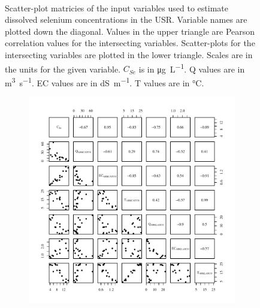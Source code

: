 \begin{linenumbers}
\begin{landscape}
\begin{figure}
\begin{subfigure}{0.7\textwidth}
		\end{subfigure}\\
		\caption[Scatter-plot matricies of the input variables used to estimate dissolved selenium concentrations in the USR.]{Scatter-plot matricies of the input variables used to estimate dissolved selenium concentrations in the USR.  Variable names are plotted down the diagonal.  Values in the upper triangle are Pearson correlation values for the intersecting variables.  Scatter-plots for the intersecting variables are plotted in the lower triangle.  Scales are in the units for the given variable.  $C_{Se}$ is in \si{\micro\gram\per\liter}.  Q values are in \si{\cubic\meter\per\second}.  EC values are in \si{\deci\siemens\per\meter}.  T values are in \si{\degreeCelsius}.}
		\label{fig:concFullPairs_US}
	\end{figure}
\end{landscape}
\subfiguremid
\begin{landscape}
	\begin{figure}
		\begin{subfigure}{0.7\textwidth}
			\centering
			\includegraphics[width=\tableCustomSize]{"Figures/Results_USR/Stochastic/Conc Model Full PairsU167"}
		\end{subfigure}%
		\begin{subfigure}{0.7\textwidth}

\end{subfigure}
\end{figure}
\end{landscape}
\end{linenumbers}
